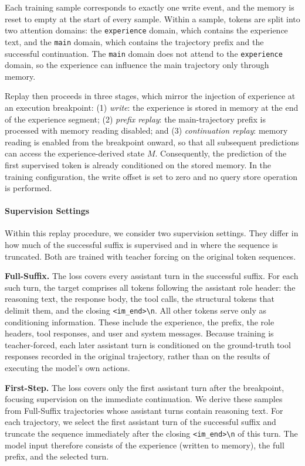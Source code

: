 Each training sample corresponds to exactly one write event, and the
memory is reset to empty at the start of every sample. Within a sample,
tokens are split into two attention domains: the \texttt{experience}
domain, which contains the experience text, and the \texttt{main} domain,
which contains the trajectory prefix and the successful continuation. The
\texttt{main} domain does not attend to the \texttt{experience} domain, so
the experience can influence the main trajectory only through memory.

Replay then proceeds in three stages, which mirror the injection of
experience at an execution breakpoint:
(1) \emph{write}: the experience is stored in memory at the end of the
experience segment;
(2) \emph{prefix replay}: the main-trajectory prefix is processed with
memory reading disabled; and
(3) \emph{continuation replay}: memory reading is enabled from the
breakpoint onward, so that all subsequent predictions can access the
experience-derived state $M$. Consequently, the prediction of the first supervised token is already
conditioned on the stored memory. In the training configuration, the
write offset is set to zero and no query store operation is performed.

\paragraph{Supervision Settings}\label{supervision-settings}

Within this replay procedure, we consider two supervision settings. They
differ in how much of the successful suffix is supervised and in where the
sequence is truncated. Both are trained with teacher forcing on the
original token sequences.

\textbf{Full-Suffix.} The loss covers every assistant turn in the
successful suffix. For each such turn, the target comprises all tokens
following the assistant role header: the reasoning text, the response
body, the tool calls, the structural tokens that delimit them, and the
closing
\texttt{\textless{}\textbar{}im\_end\textbar{}\textgreater{}\textbackslash{}n}.
All other tokens serve only as conditioning information. These include
the experience, the prefix, the role headers, tool responses, and user and
system messages. Because training is teacher-forced, each later assistant
turn is conditioned on the ground-truth tool responses recorded in the
original trajectory, rather than on the results of executing the model's
own actions.

\textbf{First-Step.} The loss covers only the first assistant turn after the
breakpoint, focusing supervision on the immediate continuation. We derive these samples from Full-Suffix trajectories whose
assistant turns contain reasoning text. For each trajectory, we select the
first assistant turn of the successful suffix and truncate the sequence
immediately after the closing
\texttt{\textless{}\textbar{}im\_end\textbar{}\textgreater{}\textbackslash{}n}
of this turn. The model input therefore consists of the experience
(written to memory), the full prefix, and the selected turn.

